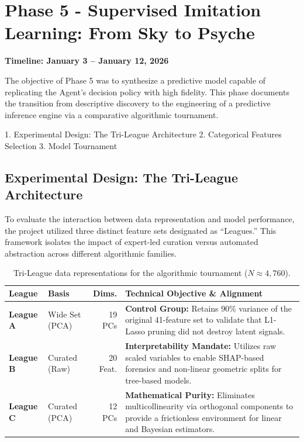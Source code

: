 
\section{Phase 5 - Supervised Imitation Learning: From Sky to Psyche}


\noindent \textbf{Timeline: January 3 -- January 12, 2026}

The objective of Phase 5 was to synthesize a predictive model capable of replicating the Agent’s decision policy with high fidelity. This phase documents the transition from descriptive discovery to the engineering of a predictive inference engine via a comparative algorithmic tournament.

1. Experimental Design: The Tri-League Architecture
2. Categorical Features Selection
3. Model Tournament



\subsection{Experimental Design: The Tri-League Architecture}
To evaluate the interaction between data representation and model performance, the project utilized three distinct feature sets designated as ``Leagues.'' This framework isolates the impact of expert-led curation versus automated abstraction across different algorithmic families.

\begin{table}[H]
    \centering
    \small
    \begin{tabularx}{\textwidth}{l l r X}
        \toprule
        \textbf{League} & \textbf{Basis} & \textbf{Dims.} & \textbf{Technical Objective \& Alignment} \\
        \midrule
        \textbf{League A} & Wide Set (PCA) & 19 PCs & \textbf{Control Group:} Retains 90\% variance of the original 41-feature set to validate that L1-Lasso pruning did not destroy latent signals. \\
        \addlinespace
        \textbf{League B} & Curated (Raw) & 20 Feat. & \textbf{Interpretability Mandate:} Utilizes raw scaled variables to enable SHAP-based forensics and non-linear geometric splits for tree-based models. \\
        \addlinespace
        \textbf{League C} & Curated (PCA) & 12 PCs & \textbf{Mathematical Purity:} Eliminates multicollinearity via orthogonal components to provide a frictionless environment for linear and Bayesian estimators. \\
        \bottomrule
    \end{tabularx}
    \caption{Tri-League data representations for the algorithmic tournament ($N \approx 4,760$).}
    \label{tab:league_alignment}
\end{table}


